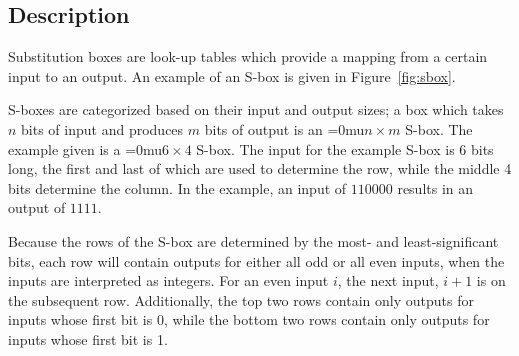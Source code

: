 \documentclass[a4paper,10pt,twoside,openright]{book}
\renewcommand{\sc}[1]{\textsc{\lowercase{#1}}}
\newcommand*\sixbyfour{\begingroup\medmuskip=0mu\relax$6 \times 4$\endgroup}
\newcommand*\nbym{\begingroup\medmuskip=0mu\relax$n \times m$\endgroup}
\begin{document}
\subsection{Description}
Substitution boxes are look-up tables which provide a mapping from a certain input to an output. An example of an S-box is given in Figure~\ref{fig:sbox}. 
\begin{figure*}
        \centering
        \setlength{\tabcolsep}{2pt}
        \footnotesize
        
        \caption[\sc{DES}'s $S_4$ S-box]{\sc{DES}'s \sixbyfour{} S-box $S_4$. Highlighted is the row and column for the input pattern $110000$. The output for this pattern is $1111$.}
        \label{fig:sbox}
\end{figure*}

S-boxes are categorized based on their input and output sizes; a box which takes $n$ bits of input and produces $m$ bits of output is an \nbym{} S-box. The example given is a \sixbyfour{} S-box. The input for the example S-box is 6 bits long, the first and last of which are used to determine the row, while the middle 4 bits determine the column. In the example, an input of $110000$ results in an output of $1111$.

Because the rows of the S-box are determined by the most- and least-significant bits, 
each row will contain outputs for either all odd or all even inputs, when the inputs are interpreted as integers.
For an even input $i$, the next input, $i + 1$ is on the subsequent row.
Additionally, the top two rows contain only outputs for inputs whose first bit is 0, 
while the bottom two rows contain only outputs for inputs whose first bit is 1.
%    
\end{document}
